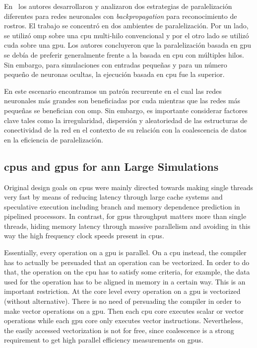 {En~\cite{HUQQANI2013349} los autores desarrollaron y analizaron dos estrategias de paralelización diferentes para redes neuronales con \emph{backpropagation} para reconocimiento de rostros.
El trabajo se concentró en dos ambientes de paralelización.
Por un lado, se utilizó \gls{omp} sobre una \gls{cpu} multi-hilo convencional y por el otro lado se utilizó \gls{cuda} sobre una \gls{gpu}.
Los autores concluyeron que la paralelización basada en \gls{gpu} se debía de preferir generalmente frente a la basada en \gls{cpu} con múltiples hilos.
Sin embargo, para simulaciones con entradas pequeñas y para un número pequeño de neuronas ocultas, la ejecución basada en \gls{cpu} fue la superior.

En este escenario encontramos un patrón recurrente en el cual las redes neuronales más grandes son beneficiadas por \gls{cuda} mientras que las redes más pequeñas se benefician con \gls{omp}.
Sin embargo, es importante considerar factores clave tales como la irregularidad, dispersión y aleatoriedad de las estructuras de conectividad de la red en el contexto de su relación con la coalescencia de datos en la eficiencia de paralelización.
}{
\subsection{\glspl{cpu} and \glspl{gpu} for \gls{ann} Large Simulations}

Original design goals on \glspl{cpu} were mainly directed towards making single threads very fast by means of reducing latency through large cache systems and speculative execution including branch and memory dependence prediction in pipelined processors. In contrast, for \glspl{gpu} throughput matters more than single threads, hiding memory latency through massive parallelism and avoiding in this way the high frequency clock speeds present in \glspl{cpu}.

Essentially, every operation on a \gls{gpu} is parallel. On a \gls{cpu} instead, the compiler has to actually be persuaded that an operation can be vectorized. In order to do that, the operation on the \gls{cpu} has to satisfy some criteria, for example, the data used for the operation has to be aligned in memory in a certain way. This is an important restriction. At the core level every operation on a \gls{gpu} is vectorized (without alternative). There is no need of persuading the compiler in order to make vector operations on a \gls{gpu}. Then each \gls{cpu} core executes scalar or vector operations while each \gls{gpu} core only executes vector instructions. Nevertheless, the easily accessed vectorization is not for free, since coalescence is a strong requirement to get high parallel efficiency measurements on \glspl{gpu}.

}
